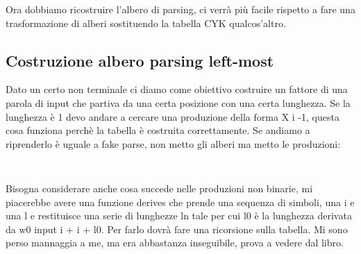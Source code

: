 Ora dobbiamo ricostruire l'albero di parsing, ci verrà più facile rispetto a fare una trasformazione di alberi sostituendo la tabella CYK qualcos'altro.

\subsection{Costruzione albero parsing left-most}
Dato un certo non terminale ci diamo come obiettivo costruire un fattore di una parola di input che partiva da una certa posizione con una certa lunghezza.
Se la lunghezza è 1 devo andare a cercare una produzione della forma X i -1, questa cosa funziona perchè la tabella è costruita correttamente. Se andiamo a riprenderlo è uguale a fake parse, non metto gli alberi ma metto le produzioni:
\begin{lstlisting}
    
\end{lstlisting}

Bisogna considerare anche cosa succede nelle produzioni non binarie, mi piacerebbe avere una funzione derives che prende una sequenza di simboli, una i e una l e restituisce una serie di lunghezze ln tale per cui l0 è la lunghezza derivata da w0 input i + i + l0. Per farlo dovrà fare una ricorsione sulla tabella.
Mi sono perso mannaggia a me, ma era abbastanza inseguibile, prova a vedere dal libro.